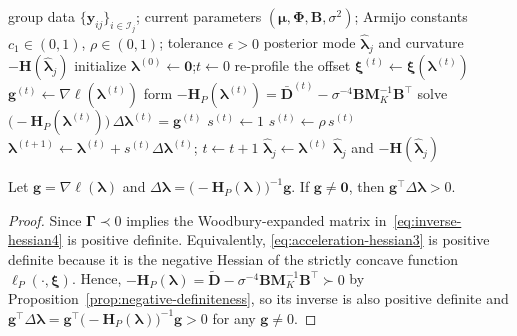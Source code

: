 \begin{algorithm}[t]
    \caption{E-step inner iteration: posterior-mode search for the group effect $\bm{\lambda}_j$}
    \label{alg:estep-inner}
    \begin{algorithmic}[1]
    \Require group data $\{\bm{y}_{ij}\}_{i\in\mathcal{I}_j}$; current parameters
         $(\bm{\mu},\bm{\Phi},\mathbf{B},\sigma^2)$; Armijo constants
         $c_1\in(0,1)$, $\rho\in(0,1)$; tolerance $\epsilon>0$
    \Ensure posterior mode $\widehat{\bm{\lambda}}_j$ and curvature $-\mathbf{H}(\widehat{\bm{\lambda}}_j)$
    \State initialize $\bm{\lambda}^{(0)}\gets \mathbf{0}$;\quad $t\gets 0$
    \Repeat
    \State re-profile the offset $\bm{\xi}^{(t)}\gets \bm{\xi}(\bm{\lambda}^{(t)})$
    \State $\mathbf{g}^{(t)}\gets \nabla\ell(\bm{\lambda}^{(t)})$
    \State form $-\mathbf{H}_P(\bm{\lambda}^{(t)})
         =\bar{\mathbf{D}}^{(t)}-\sigma^{-4}\mathbf{B}\mathbf{M}_K^{-1}\mathbf{B}^\top$
    \State solve $\bigl(-\mathbf{H}_P(\bm{\lambda}^{(t)})\bigr)\,\Delta\bm{\lambda}^{(t)}=\mathbf{g}^{(t)}$
    \State $s^{(t)}\gets 1$
    \State $s^{(t)}\gets \rho\,s^{(t)}$
    \EndWhile
    \State $\bm{\lambda}^{(t+1)}\gets \bm{\lambda}^{(t)}+s^{(t)}\Delta\bm{\lambda}^{(t)}$;\quad
         $t\gets t+1$
    \State $\widehat{\bm{\lambda}}_j\gets \bm{\lambda}^{(t)}$
    \State \Return $\widehat{\bm{\lambda}}_j$ and
       $-\mathbf{H}(\widehat{\bm{\lambda}}_j)$
    \end{algorithmic}
    \end{algorithm}

\begin{lemma}
    Let $\mathbf{g}=\nabla \ell(\bm{\lambda})$ and $\Delta \bm{\lambda}=\bigl(-\mathbf{H}_{P}(\bm{\lambda})\bigr)^{-1}\mathbf{g}$. If $\mathbf{g}\neq \bm{0}$, then $\mathbf{g}^{\top}\Delta \bm{\lambda}>0$.
\end{lemma}

\begin{proof}
    Since $\bm{\Gamma}\prec 0$ implies the Woodbury-expanded matrix in~\eqref{eq:inverse-hessian4} is positive definite. Equivalently, \eqref{eq:acceleration-hessian3} is positive definite because it is the negative Hessian of the strictly concave function $\ell_{P}(\cdot, \bm{\xi})$. Hence, $-\mathbf{H}_{P}(\bm{\lambda})=\tilde{\mathbf{D}}-\sigma^{-4}\mathbf{BM}_{K}^{-1}\mathbf{B}^{\top}\succ 0$ by Proposition~\ref{prop:negative-definiteness}, so its inverse is also positive definite and $\mathbf{g}^{\top}\Delta\bm{\lambda}=\mathbf{g}^{\top}\bigl(-\mathbf{H}_{P}(\bm{\lambda})\bigr)^{-1}\mathbf{g}>0$ for any $\mathbf{g}\neq 0$.
\end{proof}

